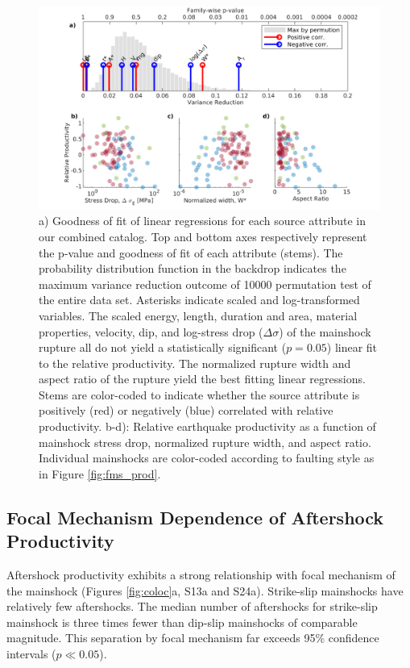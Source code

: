 \documentclass[draft, jgrga]{agujournal2018}
\begin{document}
    \begin{figure}
        \centering
        \includegraphics[width = \linewidth]{stem_plot.png}
        \caption{a) Goodness of fit of linear regressions for each source attribute in our combined catalog. Top and bottom axes respectively represent the p-value and goodness of fit of each attribute (stems). The probability distribution function in the backdrop indicates the maximum variance reduction outcome of 10000 permutation test of the entire data set. Asterisks indicate scaled and log-transformed variables. The scaled energy, length, duration and area, material properties, velocity, dip, and log-stress drop ($\Delta\sigma$) of the mainshock rupture all do not yield a statistically significant ($p=0.05$) linear fit to the relative productivity. The normalized rupture width and aspect ratio of the rupture yield the best fitting linear regressions. Stems are color-coded to indicate whether the source attribute is positively (red) or negatively (blue) correlated with relative productivity. b-d): Relative earthquake productivity as a function of mainshock stress drop, normalized rupture width, and aspect ratio. Individual mainshocks are color-coded according to faulting style as in Figure \ref{fig:fms_prod}.}
        \label{fig:r2_finite_fault}
    \end{figure}

    \subsection{Focal Mechanism Dependence of Aftershock Productivity}

    Aftershock productivity exhibits a strong relationship with focal mechanism of the mainshock (Figures \ref{fig:coloc}a, S13a and S24a). Strike-slip mainshocks have relatively few aftershocks. The median number of aftershocks for strike-slip mainshock is three times fewer than dip-slip mainshocks of comparable magnitude. This separation by focal mechanism far exceeds 95\% confidence intervals ($p\ll 0.05$).
\end{document}
